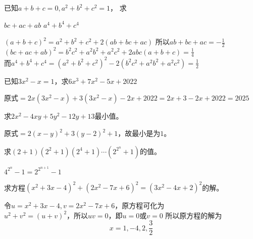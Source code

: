 \documentclass[windows,csize4,answers]{BHCexam}
\begin{document}
\begin{groups}
\begin{questions}[]
        \question[5] 已知$a+b+c=0,a^2+b^2+c^2=1$， 求
        \begin{subquestions}
            \subquestion $bc+ac+ab$
            \subquestion $a^4+b^4+c^4$
        \end{subquestions}
        \begin{solution}{0.5cm}
            \methodonly $(a+b+c)^2=a^2+b^2+c^2+2(ab+bc+ac)$ 所以$ab+bc+ac=-\frac{1}{2}$\\
            $(bc+ac+ab)^2=b^2c^2+a^2b^2+a^2c^2+2abc(a+b+c)=\frac{1}{4}$ \\
            而$a^4+b^4+c^4=(a^2+b^2+c^2)^2-2(b^2c^2+a^2b^2+a^2c^2)=\frac{1}{2}$
        \end{solution}
        \vspace{3.5cm}

        \question[5] 已知$3x^2-x=1$，求$6x^3+7x^2-5x+2022$
        \begin{solution}{0.5cm}
            \methodonly 原式$=2x(3x^2-x)+3(3x^2-x)-2x+2022=2x+3-2x+2022=2025$
        \end{solution}
        \vspace{3.5cm}

        \question[5] 求$2x^2-4xy+5y^2-12y+13$最小值。
        \begin{solution}{0.5cm}
            \methodonly 原式$=2(x-y)^2+3(y-2)^2+1$，故最小是为$1$。
        \end{solution}
        \vspace{3.5cm}

        \question[5] 求$(2+1)(2^2+1)(2^4+1)\cdots(2^{2^n}+1)$的值。
        \begin{solution}{0.5cm}
            \methodonly $4^{2^n}-1=2^{2^{n+1}}-1$
        \end{solution}
        \vspace{3.5cm}

        \question[5] 求方程$(x^2+3x-4)^2+(2x^2-7x+6)^2=(3x^2-4x+2)^2$的解。
        \begin{solution}{0.5cm}
            \methodonly 令$u=x^2+3x-4, v=2x^2-7x+6$，原方程可化为\\
            $u^2+v^2=(u+v)^2$，所以$uv=0$，即$u=0$或$v=0$
            所以原方程的解为 $$ x=1,-4,2,\frac{3}{2}$$
            
        \end{solution}
    \end{questions}

\end{groups}
\label{lastpage}
\end{document}
